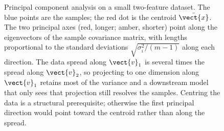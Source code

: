 \begin{figure}[htbp]
\begin{tikzpicture}
\end{tikzpicture}
\caption[Principal component axes overlaid on a 2D scatter]{Principal
component analysis on a small two-feature dataset. The blue points are
the samples; the red dot is the centroid $\bar{\vect{x}}$. The two
principal axes (red, longer; amber, shorter) point along the
eigenvectors of the sample covariance matrix, with lengths proportional
to the standard deviations $\sqrt{\sigma_{i}^{2}/(m-1)}$ along each
direction. The data spread along $\vect{v}_{1}$ is several times the
spread along $\vect{v}_{2}$, so projecting to one dimension along
$\vect{v}_{1}$ retains most of the variance and a downstream model
that only sees that projection still resolves the samples. Centring
the data is a structural prerequisite; otherwise the first principal
direction would point toward the centroid rather than along the
spread.}
\label{fig:vol02:ch10:pca-axes}
\end{figure}
